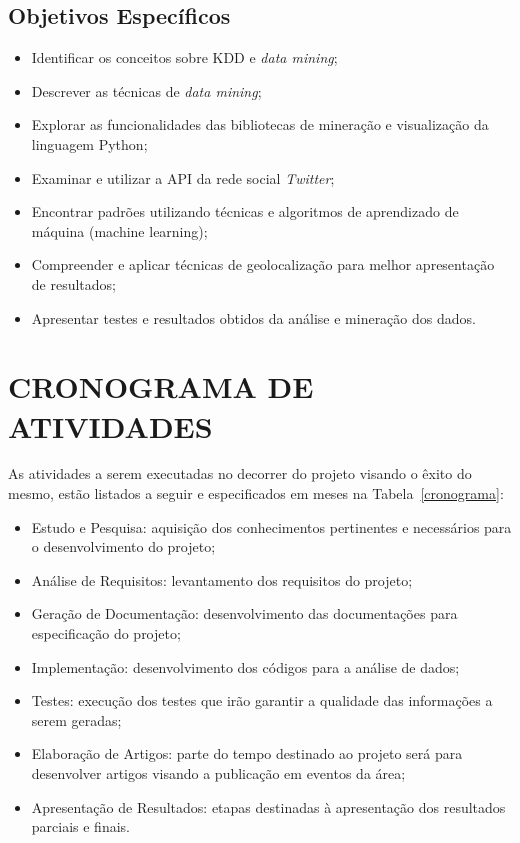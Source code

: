 \subsection{Objetivos Específicos}\label{subsec:objetivos_especificos}
\begin{itemize}
	\item Identificar os conceitos sobre KDD e \textit{data mining};
	\item Descrever as técnicas de \textit{data mining};
	\item Explorar as funcionalidades das bibliotecas de mineração e visualização da linguagem Python;
	\item Examinar e utilizar a API da rede social \textit{Twitter};
	\item Encontrar padrões utilizando técnicas e algoritmos de aprendizado de máquina (machine learning);
	\item Compreender e aplicar técnicas de geolocalização para melhor apresentação de resultados;
	\item Apresentar testes e resultados obtidos da análise e mineração dos dados.
\end{itemize}

\section{CRONOGRAMA DE ATIVIDADES}\label{subsec:cronograma}

As atividades a serem executadas no decorrer do projeto visando o êxito do mesmo, estão listados a seguir e especificados em meses na Tabela~\ref{cronograma}:

\begin{itemize}
  \item Estudo e Pesquisa: aquisição dos conhecimentos pertinentes e necessários para o desenvolvimento do projeto;
  \item Análise de Requisitos: levantamento dos requisitos do projeto;
  \item Geração de Documentação: desenvolvimento das documentações para especificação do projeto;
  \item Implementação: desenvolvimento dos códigos para a análise de dados;
  \item Testes: execução dos testes que irão garantir a qualidade das informações a serem geradas;
  \item Elaboração de Artigos: parte do tempo destinado ao projeto será para desenvolver artigos visando a publicação em eventos da área;
  \item Apresentação de Resultados: etapas destinadas à apresentação dos resultados parciais e finais.
\end{itemize}


